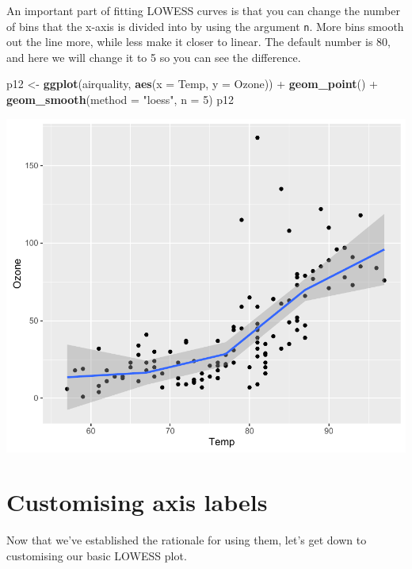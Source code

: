 \documentclass[]{article}
\newenvironment{Shaded}{\begin{snugshade}}{\end{snugshade}}
\newcommand{\KeywordTok}[1]{\textcolor[rgb]{0.13,0.29,0.53}{\textbf{{#1}}}}
\newcommand{\DataTypeTok}[1]{\textcolor[rgb]{0.13,0.29,0.53}{{#1}}}
\newcommand{\DecValTok}[1]{\textcolor[rgb]{0.00,0.00,0.81}{{#1}}}
\newcommand{\StringTok}[1]{\textcolor[rgb]{0.31,0.60,0.02}{{#1}}}
\newcommand{\NormalTok}[1]{{#1}}
\begin{document}
An important part of fitting LOWESS curves is that you can change the
number of bins that the x-axis is divided into by using the argument
\texttt{n}. More bins smooth out the line more, while less make it
closer to linear. The default number is 80, and here we will change it
to 5 so you can see the difference.

\begin{Shaded}
\begin{Highlighting}[]
\NormalTok{p12 <-}\StringTok{ }\KeywordTok{ggplot}\NormalTok{(airquality, }\KeywordTok{aes}\NormalTok{(}\DataTypeTok{x =} \NormalTok{Temp, }\DataTypeTok{y =} \NormalTok{Ozone)) +}\StringTok{ }
\StringTok{  }\KeywordTok{geom_point}\NormalTok{() +}\StringTok{ }
\StringTok{  }\KeywordTok{geom_smooth}\NormalTok{(}\DataTypeTok{method =} \StringTok{"loess"}\NormalTok{, }\DataTypeTok{n =} \DecValTok{5}\NormalTok{)}
\NormalTok{p12}
\end{Highlighting}
\end{Shaded}

\begin{center}\includegraphics{12_Lowess_Plots_pdf/lowess_4-1} \end{center}

\section{Customising axis labels}\label{customising-axis-labels}

Now that we've established the rationale for using them, let's get down
to customising our basic LOWESS plot.
\end{document}
